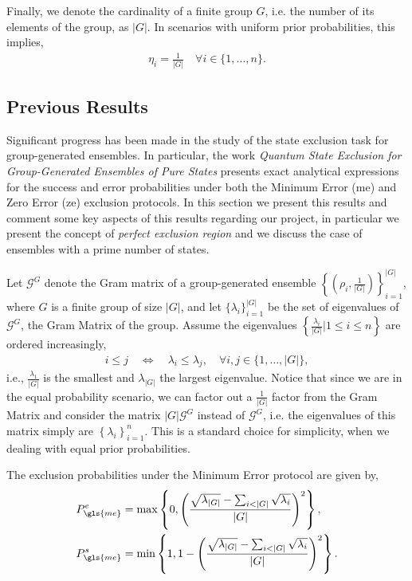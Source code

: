 \documentclass[12pt,letterpaper]{article}
\begin{document}
Finally, we denote the cardinality of a finite group $G$, i.e. the number of its elements of the group, as $|G|$. In scenarios with uniform prior probabilities, this implies,
\begin{align*}
	\eta_i = \frac{1}{|G|}\quad \forall i\in\{1,...,n\}.
\end{align*}
\subsection{Previous Results}\label{sectionPreviousResults}

Significant progress has been made in the study of the state exclusion task for group-generated ensembles. In particular, the work \emph{Quantum State Exclusion for Group-Generated Ensembles of Pure States}\cite{MainPaper} presents exact analytical expressions for the success and error probabilities under both the Minimum Error (\gls{me}) and Zero Error (\gls{ze}) exclusion protocols. In this section we present this results and comment some key aspects of this results regarding our project, in particular we present the concept of \emph{perfect exclusion region} and we discuss the case of ensembles with a prime number of states.

Let $\mathcal{G}^G$ denote the Gram matrix of a group-generated ensemble $\left\{ \left( \rho_i, \frac{1}{|G|} \right) \right\}_{i=1}^{|G|}$, where $G$ is a finite group of size $|G|$, and let $\{\lambda_i\}_{i=1}^{|G|}$ be the set of eigenvalues of $\mathcal{G}^G$, the Gram Matrix of the group. Assume the eigenvalues $\left\{\frac{\lambda_i}{|G|}|1\leq i \leq n\right\}$ are ordered increasingly,
\begin{align*}
	i \leq j \quad \Leftrightarrow \quad \lambda_i \leq \lambda_j, \quad \forall i,j \in \{1, \dots, |G|\},
\end{align*}
i.e., $\frac{\lambda_1}{|G|}$ is the smallest and $\lambda_{|G|}$ the largest eigenvalue. Notice that since we are in the equal probability scenario, we can factor out a $\frac{1}{|G|}$ factor from the Gram Matrix and consider the matrix $|G|\mathcal{G}^G$ instead of $\mathcal{G}^G$, i.e. the eigenvalues of this matrix simply are $\left\{\lambda_i\right\}_{i=1}^n$. This is a standard choice for simplicity, when we dealing with equal prior probabilities.

The exclusion probabilities under the Minimum Error protocol are given by,
\begin{align*}
	P_{\gls{me}}^e &= \max\left\{ 0, \left( \frac{ \sqrt{\lambda_{|G|}} - \sum_{i<|G|} \sqrt{\lambda_i} }{|G|} \right)^2 \right\}, \\
	P_{\gls{me}}^s &= \min\left\{ 1, 1 - \left( \frac{ \sqrt{\lambda_{|G|}} - \sum_{i<|G|} \sqrt{\lambda_i} }{|G|} \right)^2 \right\}.
\end{align*}
\end{document}

